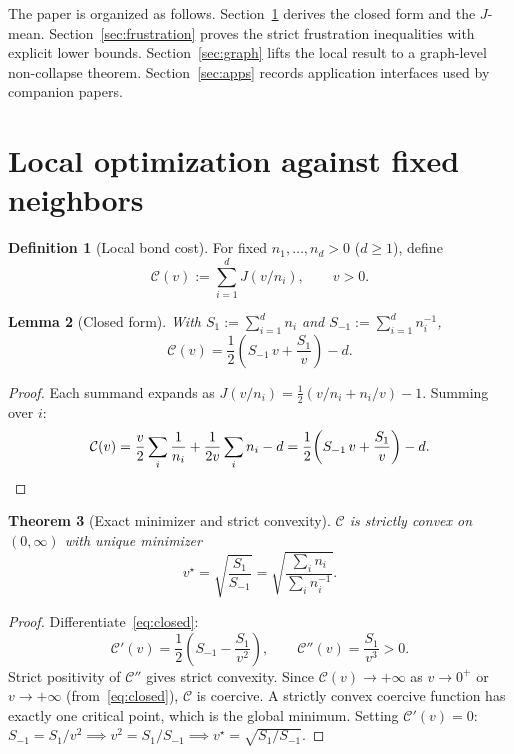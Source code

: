 \documentclass[11pt]{amsart}
\newtheorem{theorem}{Theorem}[section]
\newtheorem{lemma}[theorem]{Lemma}
\theoremstyle{definition}
\newtheorem{definition}[theorem]{Definition}
\theoremstyle{remark}
\begin{document}
The paper is organized as follows.
Section~\ref{sec:local} derives the closed form and the $J$-mean.
Section~\ref{sec:frustration} proves the strict frustration inequalities
with explicit lower bounds.
Section~\ref{sec:graph} lifts the local result to a graph-level
non-collapse theorem.
Section~\ref{sec:apps} records application interfaces used by companion
papers.

\section{Local optimization against fixed neighbors}\label{sec:local}

\begin{definition}[Local bond cost]
For fixed $n_1,\dots,n_d>0$ ($d\ge1$), define
\[
\mathcal C(v):=\sum_{i=1}^d J(v/n_i),\qquad v>0.
\]
\end{definition}

\begin{lemma}[Closed form]\label{lem:closed}
With $S_1:=\sum_{i=1}^d n_i$ and $S_{-1}:=\sum_{i=1}^d n_i^{-1}$,
\begin{equation}\label{eq:closed}
\mathcal C(v)=\frac12\!\left(S_{-1}\,v+\frac{S_1}{v}\right)-d.
\end{equation}
\end{lemma}
\begin{proof}
Each summand expands as
$J(v/n_i)=\frac12(v/n_i+n_i/v)-1$.
Summing over $i$:
\[
\mathcal C(v)
=\frac{v}{2}\sum_i\frac{1}{n_i}+\frac{1}{2v}\sum_i n_i-d
=\frac12\!\left(S_{-1}\,v+\frac{S_1}{v}\right)-d.
\qedhere
\]
\end{proof}

\begin{theorem}[Exact minimizer and strict convexity]\label{thm:min}
$\mathcal C$ is strictly convex on $(0,\infty)$ with unique minimizer
\begin{equation}\label{eq:vstar}
v^\star=\sqrt{\frac{S_1}{S_{-1}}}
=\sqrt{\frac{\sum_i n_i}{\sum_i n_i^{-1}}}.
\end{equation}
\end{theorem}
\begin{proof}
Differentiate~\eqref{eq:closed}:
\[
\mathcal C'(v)=\frac12\!\left(S_{-1}-\frac{S_1}{v^2}\right),\qquad
\mathcal C''(v)=\frac{S_1}{v^3}>0.
\]
Strict positivity of $\mathcal C''$ gives strict convexity.
Since $\mathcal C(v)\to+\infty$ as $v\to0^+$ or $v\to+\infty$
(from~\eqref{eq:closed}), $\mathcal C$ is coercive.
A strictly convex coercive function has exactly one critical point,
which is the global minimum.
Setting $\mathcal C'(v)=0$: $S_{-1}=S_1/v^2\implies v^2=S_1/S_{-1}
\implies v^\star=\sqrt{S_1/S_{-1}}$.
\end{proof}
\end{document}
